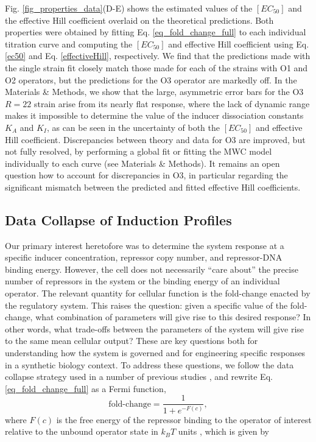 Fig. \ref{fig_properties_data}(D-E) shows the estimated values of
the $[EC_{50}]$ and the effective Hill coefficient overlaid on the theoretical
predictions. Both properties were obtained by fitting Eq. \ref{eq_fold_change_full}
to each individual titration curve and computing the $[EC_{50}]$ and effective
Hill coefficient using Eq. \ref{ec50} and Eq. \ref{effectiveHill}, respectively. We
find that the predictions made with the single strain fit closely match those
made for each of the strains with O1 and O2 operators, but the predictions for
the O3 operator are markedly off. In the Materials \& Methods, we show that the large, asymmetric error bars
for the O3 $R=22$ strain arise from its nearly flat response, where the lack of
dynamic range makes it impossible to determine the value of the inducer
dissociation constants $K_A$ and $K_I$, as can be seen in the uncertainty of
both the $[EC_{50}]$ and effective Hill coefficient. Discrepancies between
theory and data for O3 are improved, but not fully resolved, by performing a
global fit or fitting the MWC model individually to each curve (see
Materials \& Methods). It remains an open question how to
account for discrepancies in O3, in particular regarding the significant
mismatch between the predicted and fitted effective Hill coefficients.


\subsection{Data Collapse of Induction Profiles}
Our primary interest heretofore was to determine the system response at a
specific inducer concentration, repressor copy number, and repressor-DNA binding
energy. However, the cell does not necessarily ``care about'' the precise number
of repressors in the system or the binding energy of an individual operator. The
relevant quantity for cellular function is the fold-change enacted by the
regulatory system. This raises the question: given a specific value of the
fold-change, what combination of parameters will give rise to this desired
response? In other words, what trade-offs between the parameters of the system
will give rise to the same mean cellular output? These are key questions both
for understanding how the system is governed and for engineering specific
responses in a synthetic biology context. To address these questions, we follow
the data collapse strategy used in a number of previous studies
\cite{Sourjik2002, Keymer2006, Swem2008}, and rewrite
Eq. \ref{eq_fold_change_full} as a Fermi function,
\begin{equation}
	\label{eq_free_energy_definition} 
	\text{fold-change} = \frac{1}{1+e^{-
F(c)}}, \end{equation} where $F(c)$ is the free energy of the repressor binding
to the operator of interest relative to the unbound operator state in $k_B T$
units  \cite{Keymer2006, Swem2008, Phillips2015a}, which is given by

